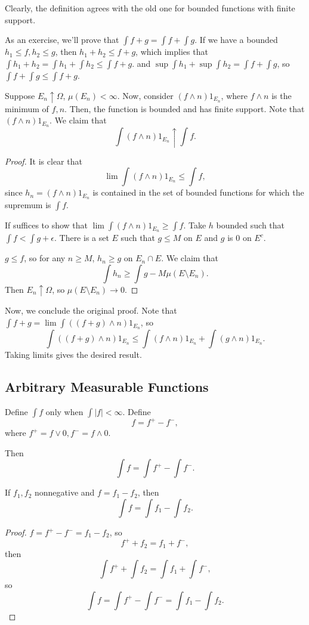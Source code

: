 \documentclass[11pt]{scrartcl}
\begin{document}
Clearly, the definition agrees with the old one for bounded functions with finite support.

As an exercise, we'll prove that $\int f+g = \int f + \int g$.  If we have a bounded $h_1 \le f, h_2 \le g$, then $h_1 + h_2 \le f+g$, which implies that $\int h_1 + h_2 = \int h_1 + \int h_2 \le \int f+g$.  and $\sup \int h_1 + \sup \int h_2 = \int f+\int g$, so $\int f + \int g \le \int f+g$.

\begin{lemma} Suppose $E_n \uparrow \Omega$, $\mu(E_n)< \infty$.  Now, consider $(f \wedge n)1_{E_n}$, where $f\wedge n$ is the minimum of $f, n$.  Then, the function is bounded and has finite support.  Note that $(f \wedge n)1_{E_n}$.  We claim that
$$\int (f \wedge n)1_{E_n} \uparrow \int f.$$
\end{lemma}
\begin{proof}
It is clear that $$\lim \int (f \wedge n) 1_{E_n} \le \int f,$$
since $h_n = (f \wedge n)1_{E_n}$ is contained in the set of bounded functions for which the supremum is $\int f$.  

If suffices to show that $\lim \int (f \wedge n)1_{E_n} \ge \int f$.  Take $h$ bounded such that $\int f < \int g + \epsilon$.  There is a set $E$ such that $g \le M$ on $E$ and $g$ is $0$ on $E^c$.  

$g \le f$, so for any $n \ge M$, $h_n \ge g$ on $E_n \cap E$.
We claim that $$\int h_n \ge \int g - M \mu(E \setminus E_n).$$  Then $E_n \uparrow \Omega$, so $\mu(E \setminus E_n) \rightarrow 0$.
\end{proof}
Now, we conclude the original proof.  Note that 
$\int f+g = \lim \int((f+g)\wedge n)1_{E_n}$,
so $$\int ((f+g)\wedge n)1_{E_n} \le \int (f\wedge n) 1_{E_n} + \int (g \wedge n)1_{E_n}.$$
Taking limits gives the desired result.
\subsection{Arbitrary Measurable Functions}
Define $\int f$ only when $\int |f| < \infty$.  Define $$f = f^+ - f^-,$$
where $f^+ = f \vee 0, f^- = f \wedge 0$.

Then $$\int f = \int f^+ - \int f^-.$$
\begin{lemma} If $f_1, f_2$ nonnegative and $f = f_1 - f_2$, then
$$\int f = \int f_1 - \int f_2.$$
\end{lemma}
\begin{proof}
$f = f^+ - f^- = f_1 - f_2$, so $$f^+ + f_2 = f_1 + f^-,$$
then $$\int f^+ + \int f_2 = \int f_1 + \int f^-,$$
so $$\int f = \int f^+ - \int f^- = \int f_1 - \int f_2.$$
\end{proof}
\pagebreak
\end{document}
